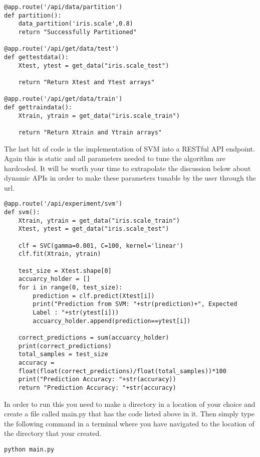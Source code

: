 \begin{lstlisting}
@app.route('/api/data/partition')
def partition():
    data_partition('iris.scale',0.8)
    return "Successfully Partitioned"

@app.route('/api/get/data/test')
def gettestdata():
    Xtest, ytest = get_data("iris.scale_test")
    
    return "Return Xtest and Ytest arrays"
    
@app.route('/api/get/data/train')
def gettraindata():
    Xtrain, ytrain = get_data("iris.scale_train")
    
    return "Return Xtrain and Ytrain arrays"
\end{lstlisting} 

The last bit of code is the implementation of SVM into a RESTful API
endpoint. Again this is static and all parameters needed to tune the
algorithm are hardcoded. It will be worth your time to extrapolate
the discussion below about dynamic APIs in order to make these
parameters tunable by the user through the url. 

\begin{lstlisting}
@app.route('/api/experiment/svm')
def svm():
    Xtrain, ytrain = get_data("iris.scale_train")
    Xtest, ytest = get_data("iris.scale_test")

    clf = SVC(gamma=0.001, C=100, kernel='linear')
    clf.fit(Xtrain, ytrain)

    test_size = Xtest.shape[0]
    accuarcy_holder = []
    for i in range(0, test_size):
        prediction = clf.predict(Xtest[i])
        print("Prediction from SVM: "+str(prediction)+", Expected
        Label : "+str(ytest[i]))
        accuarcy_holder.append(prediction==ytest[i])

    correct_predictions = sum(accuarcy_holder)
    print(correct_predictions)
    total_samples = test_size
    accuracy =
    float(float(correct_predictions)/float(total_samples))*100
    print("Prediction Accuracy: "+str(accuracy))
    return "Prediction Accuracy: "+str(accuracy)
\end{lstlisting} 

In order to run this you need to make a directory in a location of
your choice and create a file called main.py that has the code listed
above in it. Then simply type the following command in a terminal
where you have navigated to the location of the directory that your
created. 

\begin{lstlisting}
python main.py
\end{lstlisting} 
 
